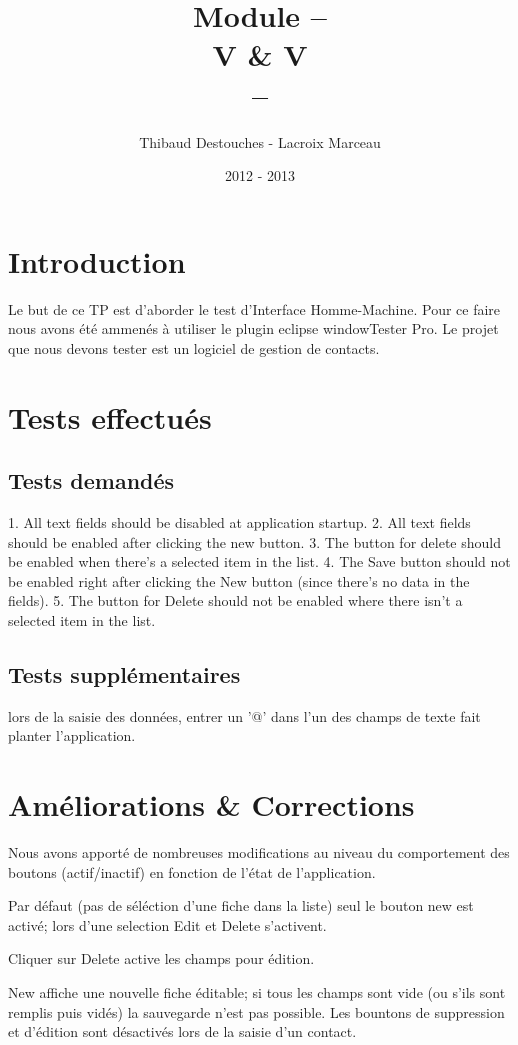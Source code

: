 \documentclass{article}
\title{Module --
\\
V \& V
\\
--}
\author{Thibaud Destouches - Lacroix Marceau}
\date{2012 - 2013}
\begin{document}
\begin{titlepage}
\maketitle
\tableofcontents
\end{titlepage}

\newpage
\section{Introduction}

Le but de ce TP est d’aborder le test d’Interface Homme-Machine. Pour ce faire nous avons été ammenés à utiliser le plugin eclipse windowTester Pro. Le projet que nous devons tester est un logiciel de gestion de contacts.

\section{Tests effectués}

\subsection{Tests demandés}

1. All text fields should be disabled at application startup.
2. All text fields should be enabled after clicking the new button.
3. The button for delete should be enabled when there's a selected item in the list.
4. The Save button should not be enabled right after clicking the New button (since there's no data in the fields). 
5. The button for Delete should not be enabled where there isn't a selected item in the list.

\subsection{Tests supplémentaires}

lors de la saisie des données, entrer un '@' dans l'un des champs de texte fait planter l'application.	



\section{Améliorations \& Corrections}

Nous avons apporté de nombreuses modifications au niveau du comportement des boutons (actif/inactif) en fonction de l'état de l'application. 

Par défaut (pas de séléction d'une fiche dans la liste) seul le bouton new est activé; lors d'une selection Edit et Delete s'activent.

Cliquer sur Delete active les champs pour édition.

New affiche une nouvelle fiche éditable; si tous les champs sont vide (ou s'ils sont remplis puis vidés) la sauvegarde n'est pas possible. Les bountons de suppression et d'édition sont désactivés lors de la saisie d'un contact.

\newpage
\end{document}
